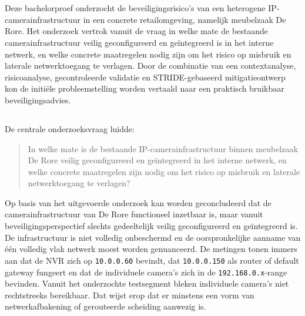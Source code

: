 
\chapter{}%
\label{ch:conclusie}

Deze bachelorproef onderzocht de beveiligingsrisico's van een heterogene IP-camerainfrastructuur in een concrete retailomgeving, namelijk meubelzaak De Rore. Het onderzoek vertrok vanuit de vraag in welke mate de bestaande camerainfrastructuur veilig geconfigureerd en geïntegreerd is in het interne netwerk, en welke concrete maatregelen nodig zijn om het risico op misbruik en laterale netwerktoegang te verlagen. Door de combinatie van een contextanalyse, risicoanalyse, gecontroleerde validatie en STRIDE-gebaseerd mitigatieontwerp kon de initiële probleemstelling worden vertaald naar een praktisch bruikbaar beveiligingsadvies.

\section{}%
\label{sec:conclusie-onderzoeksvraag}

De centrale onderzoeksvraag luidde:

\begin{quote}
    In welke mate is de bestaande IP-camerainfrastructuur binnen meubelzaak De Rore veilig geconfigureerd en geïntegreerd in het interne netwerk, en welke concrete maatregelen zijn nodig om het risico op misbruik en laterale netwerktoegang te verlagen?
\end{quote}

Op basis van het uitgevoerde onderzoek kan worden geconcludeerd dat de camerainfrastructuur van De Rore functioneel inzetbaar is, maar vanuit beveiligingsperspectief slechts gedeeltelijk veilig geconfigureerd en geïntegreerd is. De infrastructuur is niet volledig onbeschermd en de oorspronkelijke aanname van één volledig vlak netwerk moest worden genuanceerd. De metingen tonen immers aan dat de NVR zich op \texttt{10.0.0.60} bevindt, dat \texttt{10.0.0.150} als router of default gateway fungeert en dat de individuele camera's zich in de \texttt{192.168.0.x}-range bevinden. Vanuit het onderzochte testsegment bleken individuele camera's niet rechtstreeks bereikbaar. Dat wijst erop dat er minstens een vorm van netwerkafbakening of gerouteerde scheiding aanwezig is.

